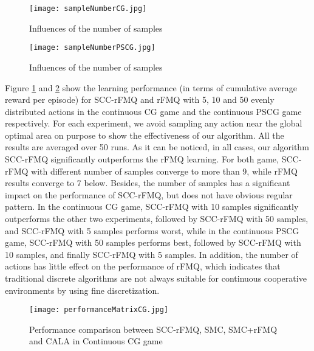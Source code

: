 \documentclass[journal,transmag]{IEEEtran}
\begin{document}





\begin{figure}[h!]
\centering
\texttt{[image: sampleNumberCG.jpg]}
\caption{Influences of the number of samples}
\label{fig:numberCG}
\end{figure}


\begin{figure}[h!]
\centering
\texttt{[image: sampleNumberPSCG.jpg]}
\caption{Influences of the number of samples}
\label{fig:numberPSCG}
\end{figure}

Figure \ref{fig:numberCG} and \ref{fig:numberPSCG}  show the learning performance (in terms of cumulative average reward per episode) for SCC-rFMQ and rFMQ with 5, 10 and 50 evenly distributed actions in the continuous CG game and the continuous PSCG game respectively. For each experiment, we avoid sampling any action near the global optimal area on purpose to show the effectiveness of our algorithm. All the results are averaged over 50 runs. As it can be noticed, in all cases, our algorithm SCC-rFMQ significantly outperforms the rFMQ learning. For both game, SCC-rFMQ with different number of samples converge to more than 9, while rFMQ results converge to 7 below. Besides, the number of samples has a significant impact on the performance of SCC-rFMQ, but does not have obvious regular pattern. In the continuous CG game, SCC-rFMQ with 10 samples significantly outperforms the other two experiments, followed by SCC-rFMQ with 50 samples, and SCC-rFMQ with 5 samples performs worst, while in the continuous PSCG game, SCC-rFMQ with 50 samples performs best, followed by SCC-rFMQ with 10 samples, and finally SCC-rFMQ with 5 samples. In addition, the number of actions has little effect on the performance of rFMQ, which indicates that traditional discrete algorithms are not always suitable for continuous cooperative environments by using fine discretization.

\begin{figure}[h!]
\centering
\texttt{[image: performanceMatrixCG.jpg]}
\caption{Performance comparison between SCC-rFMQ, SMC, SMC+rFMQ and CALA in Continuous CG game}
\label{fig:performanceCG}
\end{figure}
\end{document}
